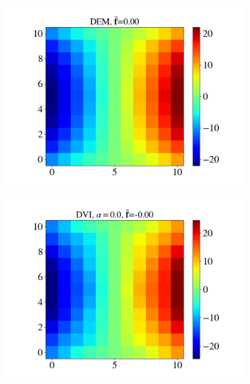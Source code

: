 \begin{itemize}
	\begin{figure}[H]
		\centering	
		\begin{subfigure}{0.32\columnwidth}	
			\centering
			\includegraphics[width=1.0\textwidth]{images/CD/Example7/10/T2_11_DEM_0.png}
		\end{subfigure}
		\begin{subfigure}{0.32\columnwidth}	
			\centering
			\includegraphics[width=1.0\textwidth]{images/CD/Example7/10/T2_11_DVI_0.0.png}
		\end{subfigure}
		\begin{subfigure}{0.32\columnwidth}	
			\centering

\end{subfigure}
\end{figure}
\end{itemize}
